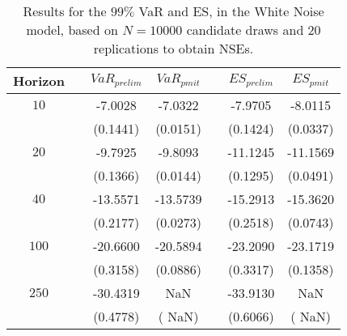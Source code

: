 \begin{table}[h] 
\centering 
\caption{Results for the $99\%$ VaR and ES, in the White Noise model, based on $N=10000$ candidate draws and $20$ replications to obtain NSEs.} 
\label{tab:res_pmit_WN} 
\begin{tabular}{ccccccc}  
 Horizon & & $VaR_{prelim}$ & $VaR_{pmit}$ & & $ES_{prelim}$ & $ES_{pmit}$ \\ \hline 
$10$ & & -7.0028 & -7.0322 & & -7.9705 & -8.0115  \\ 
 & & (0.1441) & (0.0151) & & (0.1424) & (0.0337)   \\ [1ex] 
$20$ & & -9.7925 & -9.8093 & & -11.1245 & -11.1569  \\ 
 & & (0.1366) & (0.0144) & & (0.1295) & (0.0491)   \\ [1ex] 
$40$ & & -13.5571 & -13.5739 & & -15.2913 & -15.3620  \\ 
 & & (0.2177) & (0.0273) & & (0.2518) & (0.0743)   \\ [1ex] 
$100$ & & -20.6600 & -20.5894 & & -23.2090 & -23.1719  \\ 
 & & (0.3158) & (0.0886) & & (0.3317) & (0.1358)   \\ [1ex] 
$250$ & & -30.4319 &    NaN & & -33.9130 &    NaN  \\ 
 & & (0.4778) & (   NaN) & & (0.6066) & (   NaN)   \\ [1ex] 
\hline 
\end{tabular} 
\end{table} 
